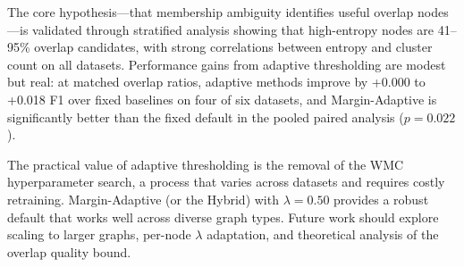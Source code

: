 \documentclass[a4paper,11pt,oneside,onecolumn,preprint]{elsarticle}
\numberwithin{equation}{section}
\begin{document}
The core hypothesis---that membership ambiguity identifies useful overlap nodes---is validated through stratified analysis showing that high-entropy nodes are 41--95\% overlap candidates, with strong correlations between entropy and cluster count on all datasets.
Performance gains from adaptive thresholding are modest but real: at matched overlap ratios, adaptive methods improve by +0.000 to +0.018 F1 over fixed baselines on four of six datasets, and Margin-Adaptive is significantly better than the fixed default in the pooled paired analysis ($p=0.022$).

The practical value of adaptive thresholding is the removal of the WMC hyperparameter search, a process that varies across datasets and requires costly retraining.
Margin-Adaptive (or the Hybrid) with $\lambda = 0.50$ provides a robust default that works well across diverse graph types.
Future work should explore scaling to larger graphs, per-node $\lambda$ adaptation, and theoretical analysis of the overlap quality bound.



\end{document}
